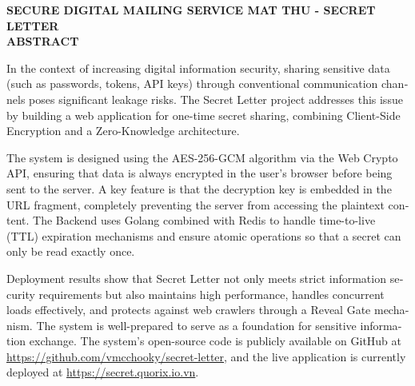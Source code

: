 \documentclass[13pt,a4paper]{extreport}
\begin{document}
\clearpage

\begin{center}\fontsize{16pt}{18pt}
    \textbf{SECURE DIGITAL MAILING SERVICE MAT THU - SECRET LETTER\\}
    \textbf{ABSTRACT}
\end{center}

\begin{english}
In the context of increasing digital information security, sharing sensitive data (such as passwords, tokens, API keys) through conventional communication channels poses significant leakage risks. The Secret Letter project addresses this issue by building a web application for one-time secret sharing, combining Client-Side Encryption and a Zero-Knowledge architecture.

The system is designed using the AES-256-GCM algorithm via the Web Crypto API, ensuring that data is always encrypted in the user's browser before being sent to the server. A key feature is that the decryption key is embedded in the URL fragment, completely preventing the server from accessing the plaintext content. The Backend uses Golang combined with Redis to handle time-to-live (TTL) expiration mechanisms and ensure atomic operations so that a secret can only be read exactly once.

Deployment results show that Secret Letter not only meets strict information security requirements but also maintains high performance, handles concurrent loads effectively, and protects against web crawlers through a Reveal Gate mechanism. The system is well-prepared to serve as a foundation for sensitive information exchange. The system's open-source code is publicly available on GitHub at \url{https://github.com/vmcchooky/secret-letter}, and the live application is currently deployed at \url{https://secret.quorix.io.vn}.
\end{english}


\clearpage


\pagestyle{plain}

\tableofcontents
\clearpage

\listoffigures
\clearpage

\listoftables
\clearpage
\end{document}
